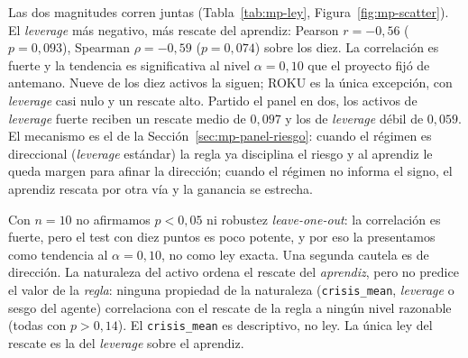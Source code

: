Las dos magnitudes corren juntas (Tabla~\ref{tab:mp-ley}, Figura~\ref{fig:mp-scatter}). El \emph{leverage} más negativo, más rescate del aprendiz: Pearson $r = -0{,}56$ ($p = 0{,}093$), Spearman $\rho = -0{,}59$ ($p = 0{,}074$) sobre los diez. La correlación es fuerte y la tendencia es significativa al nivel $\alpha = 0{,}10$ que el proyecto fijó de antemano. Nueve de los diez activos la siguen; ROKU es la única excepción, con \emph{leverage} casi nulo y un rescate alto. Partido el panel en dos, los activos de \emph{leverage} fuerte reciben un rescate medio de $0{,}097$ y los de \emph{leverage} débil de $0{,}059$. El mecanismo es el de la Sección~\ref{sec:mp-panel-riesgo}: cuando el régimen es direccional (\emph{leverage} estándar) la regla ya disciplina el riesgo y al aprendiz le queda margen para afinar la dirección; cuando el régimen no informa el signo, el aprendiz rescata por otra vía y la ganancia se estrecha.

Con $n = 10$ no afirmamos $p < 0{,}05$ ni robustez \emph{leave-one-out}: la correlación es fuerte, pero el test con diez puntos es poco potente, y por eso la presentamos como tendencia al $\alpha = 0{,}10$, no como ley exacta. Una segunda cautela es de dirección. La naturaleza del activo ordena el rescate del \emph{aprendiz}, pero no predice el valor de la \emph{regla}: ninguna propiedad de la naturaleza (\texttt{crisis\_mean}, \emph{leverage} o sesgo del agente) correlaciona con el rescate de la regla a ningún nivel razonable (todas con $p > 0{,}14$). El \texttt{crisis\_mean} es descriptivo, no ley. La única ley del rescate es la del \emph{leverage} sobre el aprendiz.

